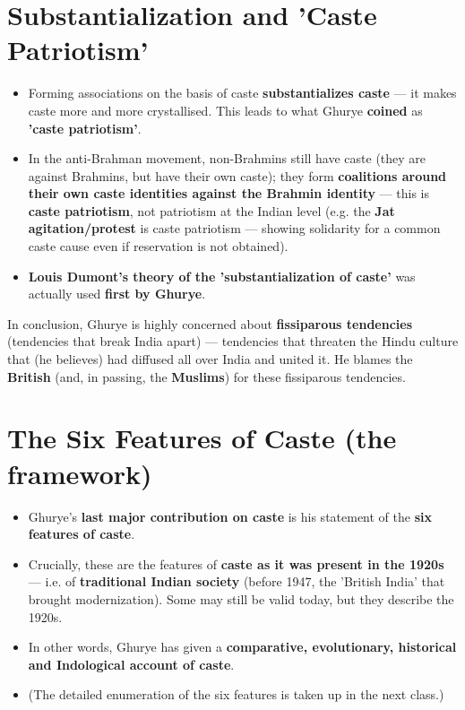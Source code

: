 \section{Substantialization and 'Caste Patriotism'}

\begin{KeyConcept}
\begin{itemize}
\item Forming associations on the basis of caste \textbf{substantializes caste} --- it makes caste more and more crystallised. This leads to what Ghurye \textbf{coined} as \textbf{'caste patriotism'}.
\item In the anti-Brahman movement, non-Brahmins still have caste (they are against Brahmins, but have their own caste); they form \textbf{coalitions around their own caste identities against the Brahmin identity} --- this is \textbf{caste patriotism}, not patriotism at the Indian level (e.g. the \textbf{Jat agitation/protest} is caste patriotism --- showing solidarity for a common caste cause even if reservation is not obtained).
\item \textbf{Louis Dumont's theory of the 'substantialization of caste'} was actually used \textbf{first by Ghurye}.
\end{itemize}
\end{KeyConcept}

\begin{KeyConcept}
In conclusion, Ghurye is highly concerned about \textbf{fissiparous tendencies} (tendencies that break India apart) --- tendencies that threaten the Hindu culture that (he believes) had diffused all over India and united it. He blames the \textbf{British} (and, in passing, the \textbf{Muslims}) for these fissiparous tendencies.
\end{KeyConcept}

\section{The Six Features of Caste (the framework)}

\begin{KeyConcept}
\begin{itemize}
\item Ghurye's \textbf{last major contribution on caste} is his statement of the \textbf{six features of caste}.
\item Crucially, these are the features of \textbf{caste as it was present in the 1920s} --- i.e. of \textbf{traditional Indian society} (before 1947, the 'British India' that brought modernization). Some may still be valid today, but they describe the 1920s.
\item In other words, Ghurye has given a \textbf{comparative, evolutionary, historical and Indological account of caste}.
\item (The detailed enumeration of the six features is taken up in the next class.)
\end{itemize}
\end{KeyConcept}

